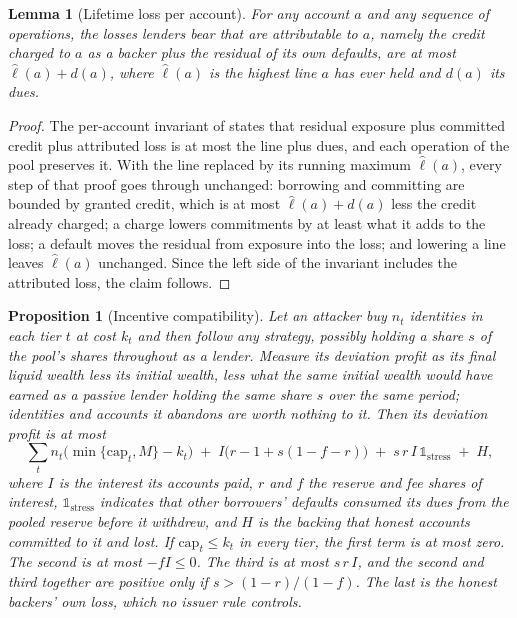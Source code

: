 \documentclass[preprint,11pt,authoryear]{elsarticle}
\newtheorem{proposition}{Proposition}
\newtheorem{lemma}{Lemma}
\begin{document}
\begin{lemma}[Lifetime loss per account]\label{lem:lifetime}
For any account $a$ and any sequence of operations, the losses lenders bear that are attributable to
$a$, namely the credit charged to $a$ as a backer plus the residual of its own defaults, are at most
$\hat\ell(a)+d(a)$, where $\hat\ell(a)$ is the highest line $a$ has ever held and $d(a)$ its dues.
\end{lemma}

\begin{proof}
The per-account invariant of \citet[Lemma~5.1]{conservedcredit2026} states that residual exposure
plus committed credit plus attributed loss is at most the line plus dues, and each operation of the
pool preserves it. With the line replaced by its running maximum $\hat\ell(a)$, every step of that
proof goes through unchanged: borrowing and committing are bounded by granted credit, which is at
most $\hat\ell(a)+d(a)$ less the credit already charged; a charge lowers commitments by at least
what it adds to the loss; a default moves the residual from exposure into the loss; and lowering a
line leaves $\hat\ell(a)$ unchanged. Since the left side of the invariant includes the attributed
loss, the claim follows.
\end{proof}

\begin{proposition}[Incentive compatibility]\label{prop:ic}
Let an attacker buy $n_t$ identities in each tier $t$ at cost $k_t$ and then follow any strategy,
possibly holding a share $s$ of the pool's shares throughout as a lender. Measure its
\emph{deviation profit} as its final liquid wealth less its initial wealth, less what the same
initial wealth would have earned as a passive lender holding the same share $s$ over the same
period; identities and accounts it abandons are worth nothing to it. Then its deviation profit is at
most
\[
  \sum_t n_t\bigl(\min\{\mathrm{cap}_t,M\}-k_t\bigr)\;+\;I\bigl(r-1+s(1-f-r)\bigr)\;+\;s\,r\,I\,\mathbb{1}_{\mathrm{stress}}\;+\;H,
\]
where $I$ is the interest its accounts paid, $r$ and $f$ the reserve and fee shares of interest,
$\mathbb{1}_{\mathrm{stress}}$ indicates that other borrowers' defaults consumed its dues from the
pooled reserve before it withdrew, and $H$ is the backing that honest accounts committed to it and
lost. If $\mathrm{cap}_t\le k_t$ in every tier, the first term is at most zero. The second is at most
$-fI\le0$. The third is at most $s\,r\,I$, and the second and third together are positive only if
$s>(1-r)/(1-f)$. The last is the honest backers' own loss, which no issuer rule controls.
\end{proposition}
\end{document}
